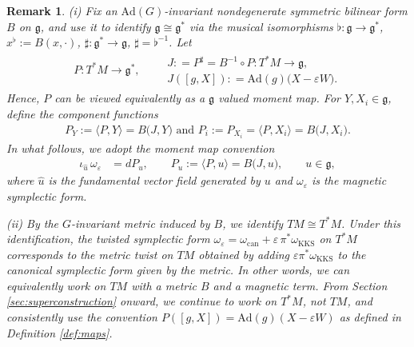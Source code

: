 \documentclass[11pt]{amsart}
\theoremstyle{definition}
\theoremstyle{plain}
\newtheorem{remark}[theorem]{Remark}
\theoremstyle{conclusion}
\begin{document}
\begin{remark}
(i) Fix an $\mathrm{Ad}(G)$-invariant nondegenerate symmetric bilinear form $B$ on $\mathfrak{g}$, and use it to identify $\mathfrak{g}\cong \mathfrak{g}^*$ via the musical isomorphisms  $\flat  : \mathfrak{g}\to \mathfrak{g}^*$,  $x^\flat := B(x,\cdot)$, $\sharp  : \mathfrak{g}^*\to \mathfrak{g}$,  $\sharp = \flat^{-1}$.  Let \begin{align*}
P  : T^*M \to \mathfrak{g}^*, \qquad  \begin{matrix}
    J  : = P^\sharp = B^{-1}\circ P : T^*M \to \mathfrak{g}, \\
J([g,X])  : = \mathrm{Ad}(g)\bigl(X-\varepsilon W\bigr).
\end{matrix} 
\end{align*} Hence, $P$ can be viewed equivalently as a $\mathfrak{g}$ valued moment map.
For $Y,X_i\in\mathfrak{g}$, define the component functions \begin{align}
P_Y  := \langle P, Y\rangle = B\bigl(J, Y\bigr)  \text{ and }  P_i  := P_{X_i} = \langle P, X_i\rangle = B\bigl(J, X_i\bigr)  . \label{eq:momcoord}
\end{align} In what follows, we adopt the moment map convention
\begin{align}
\iota_{\widehat{u}}\,\omega_{\varepsilon} &= dP_u,  \qquad  P_u := \langle P, u\rangle = B\bigl(J, u\bigr), \qquad  u\in\mathfrak{g}, \label{eq:momcoven}
\end{align} where $\widehat{u}$ is the fundamental vector field generated by $u$ and $\omega_{\varepsilon}$ is the magnetic symplectic form.


(ii) By the $G$-invariant metric induced by $B$, we identify $TM\cong  T^*M$. Under this identification, the twisted symplectic form $ \omega_\varepsilon=\omega_{\mathrm{can}}+\varepsilon\,\pi^*\omega_{\mathrm{KKS}}$ on $T^*M$ corresponds to the metric twist on $TM$ obtained by adding $\varepsilon \pi^*\omega_{\mathrm{KKS}}$ to the canonical symplectic form given by the metric. In other words,  we can equivalently work on $TM$ with a metric $B$ and a magnetic term.  From Section \ref{sec:superconstruction} onward, we continue to work on $T^*M$, not $TM$, and consistently use the convention $P([g,X]) = \mathrm{Ad}(g)(X- \varepsilon W)$ as defined in Definition \ref{def:maps}.


\end{remark}
\end{document}
